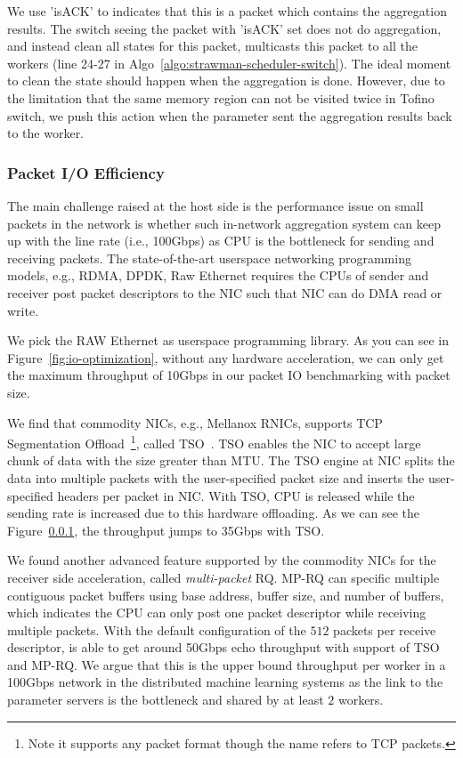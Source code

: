 We use 'isACK' to indicates that this is a packet which contains the aggregation results.
The switch seeing the packet with 'isACK' set does not do aggregation, and instead 
clean all states for this packet, multicasts
this packet to all the workers (line 24-27 in Algo~\ref{algo:strawman-scheduler-switch}). 
The ideal moment to clean the state should happen when the aggregation is done. However, due to 
the limitation that the same memory region can not be visited twice in Tofino switch, we push 
this action when the parameter sent the aggregation results back to the worker.

\subsubsection{Packet I/O Efficiency}
The main challenge raised at the host side is the performance issue on small packets in the network is whether 
such in-network aggregation system can keep up with the line rate (i.e., 100Gbps) as CPU 
is the bottleneck for sending and receiving packets.
The state-of-the-art userspace networking programming models, e.g., RDMA, DPDK, Raw Ethernet
requires the CPUs of sender and receiver post packet descriptors to the NIC such
that NIC can do DMA read or write.

We pick the RAW Ethernet as userspace programming library. As you can see in Figure~\ref{fig:io-optimization},
without any hardware acceleration, we can only get the maximum throughput of 10Gbps in our packet IO
benchmarking with \system packet size. 


We find that commodity NICs, e.g., Mellanox RNICs, supports TCP Segmentation Offload~\footnote{Note it supports any packet format though the name refers to TCP packets.}, called TSO~\cite{}. TSO enables the NIC to accept 
large chunk of data with the size greater than MTU. The 
TSO engine at NIC splits the data into multiple packets with the 
user-specified packet size and inserts the user-specified headers per packet in NIC.
With TSO, CPU is released while the sending rate is increased due to this hardware offloading. 
As we can see the Figure~\ref{}, the throughput jumps to 35Gbps with TSO.

We found another advanced feature supported by the commodity NICs for the receiver side acceleration, 
called {\it multi-packet} RQ. MP-RQ can specific multiple contiguous packet buffers
using base address, buffer size, and number of buffers, which indicates the CPU can only post one packet descriptor while receiving multiple packets. With the default configuration of the $512$ packets per receive descriptor, 
\system is able to get around 50Gbps echo throughput with support of TSO and MP-RQ. 
We argue that this is the upper bound throughput per worker in a 100Gbps network in the distributed machine learning systems
as the link to the parameter servers is the bottleneck and shared by at least $2$ workers.



